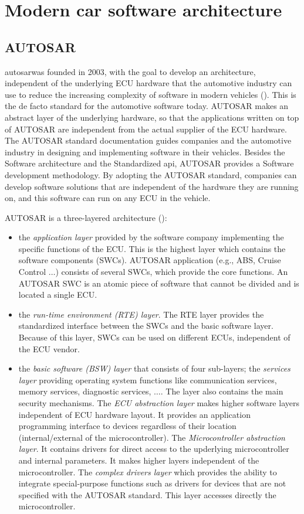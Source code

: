 \section {Modern car software architecture}

\subsection {AUTOSAR}

\gls{autosar}\@ was founded in 2003, with the goal to develop an architecture, independent of the underlying ECU hardware that the automotive industry can use to reduce the increasing complexity of software in modern vehicles (\cite{AUTOSAR}). This is the de facto standard for the automotive software today. AUTOSAR makes an abstract layer of the underlying hardware, so that the applications written on top of AUTOSAR are independent from the actual supplier of the ECU hardware. The AUTOSAR standard documentation guides companies and the automotive industry in designing and implementing software in their vehicles. Besides the Software architecture and the Standardized \gls{api}\@, AUTOSAR provides a Software development methodology. By adopting the AUTOSAR standard, companies can develop software solutions that are independent of the hardware they are running on, and this software can run on any ECU in the vehicle. 
\bigskip

AUTOSAR is a three-layered architecture (\cite{AUTOSAR_archi}): 
\begin{itemize}
    \item the \emph{application layer} provided by the software company implementing the specific functions of the ECU. This is the highest layer which contains the software components (SWCs). AUTOSAR application (e.g., ABS, Cruise Control $\ldots$) consists of several SWCs, which provide the core functions. An AUTOSAR SWC is an atomic piece of software that cannot be divided and is located a single ECU. 
    \item the \emph{run-time environment (RTE) layer}. The RTE layer provides the standardized interface between the SWCs and the basic software layer. Because of this layer, SWCs can be used on different ECUs, independent of the ECU vendor.
    \item the \emph{basic software (BSW) layer} that consists of four sub-layers; the \emph{services layer} providing operating system functions like communication services, memory services, diagnostic services, $\ldots$. The layer also contains the main security mechanisms. The \emph{ECU abstraction layer} makes higher software layers independent of ECU hardware layout. It provides an application programming interface to devices regardless of their location (internal/external of the microcontroller). The \emph{Microcontroller abstraction layer}. It contains drivers for direct access to the upderlying microcontroller and internal parameters. It makes higher layers independent of the microcontroller. The \emph{complex drivers layer} which provides the ability to integrate special-purpose functions such as drivers for devices that are not specified with the AUTOSAR standard. This layer accesses directly the microcontroller. 
\end{itemize}

